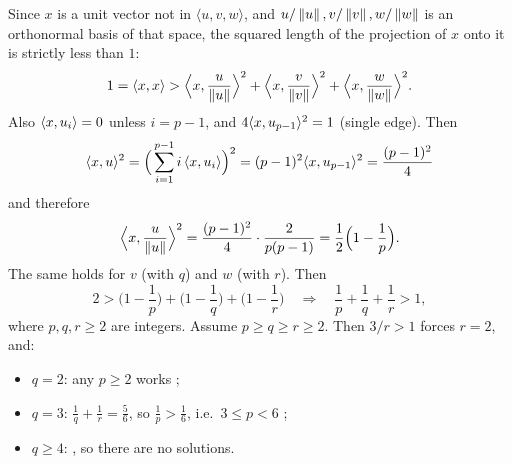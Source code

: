 Since $x$ is a unit vector not in $\langle u,v,w\rangle$, and $u/\left\lVert u \right\rVert,v/\left\lVert v \right\rVert,w/\left\lVert w \right\rVert$ is an
orthonormal basis of that space, the squared length of the projection of $x$ onto it is strictly
less than $1$:
\[
  1 = \langle x, x\rangle > \Big\langle x,\frac{u}{\left\lVert u \right\rVert}\Big\rangle^2 + \Big\langle x,\frac{v}{\left\lVert v \right\rVert}\Big\rangle^2
  + \Big\langle x,\frac{w}{\left\lVert w \right\rVert}\Big\rangle^2 .
\]
Also $\langle x, u_i\rangle=0$ unless $i=p-1$, and $4\langle x, u_{p-1}\rangle^2 = 1$ (single edge). Then
\[
  \langle x, u\rangle^2 = \Big(\sum_{i=1}^{p-1} i\,\langle x, u_i\rangle\Big)^2 = (p-1)^2\langle x, u_{p-1}\rangle^2 = \frac{(p-1)^2}{4}
\]
%
and therefore
\[
  \Big\langle x,\frac{u}{\left\lVert u \right\rVert}\Big\rangle^2 = \frac{(p-1)^2}{4}\cdot\frac{2}{p(p-1)}
   = \frac12\Big(1-\frac1p\Big).
\]
The same holds for $v$ (with $q$) and $w$ (with $r$). Then
\[
  2 > \Big(1-\frac1p\Big) + \Big(1-\frac1q\Big) + \Big(1-\frac1r\Big)
  \quad\Longrightarrow\quad \frac1p + \frac1q + \frac1r > 1,
\]
where $p,q,r\ge 2$ are integers. Assume $p\ge q\ge r\ge 2$. Then $3/r > 1$ forces $r=2$, and:
\begin{itemize}
  \item $q=2$: any $p\ge 2$ works ;
  \item $q=3$: $\frac1q+\frac1r = \frac56$, so $\frac1p>\frac16$, i.e.\ $3\le p<6$
        ;
  \item $q\ge4$: , so there are no solutions.
\end{itemize}

